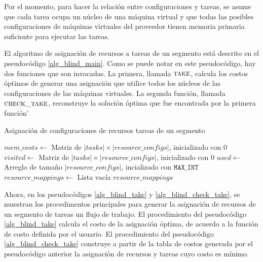 Por el momento, para hacer la relaci\'on entre configuraciones y tareas, se asume que cada tarea ocupa un núcleo de una máquina virtual y que todas las posibles configuraciones de máquinas virtuales del proveedor tienen memoria primaria suficiente para ejecutar las tareas.

El algoritmo de asignación de recursos a tareas de un segmento está descrito en el pseudocódigo \ref{alg_blind_main}. Como se puede notar en este pseudocódigo, hay dos funciones que son invocadas. La primera, llamada $\Call{take}{}$, calcula los costos óptimos de generar una asignación que utilice todos los n\'ucleos de las configuraciones de las máquinas virtuales. La segunda funci\'on, llamada $\Call{check\_take}{}$, reconstruye la soluci\'on \'optima que fue encontrada por la primera funci\'on'

\begin{algorithm}
\caption{Asignación de configuraciones de recursos tareas de un segmento}
\label{alg_blind_main}
\begin{algorithmic}[1]

	\State $mem\_costs \gets$ Matriz de $|tasks| \times |resource\_configs|$, inicializado con 0 
	\State $visited \gets$ Matriz de $|tasks| \times |resource\_configs|$, inicializado con 0
	\State $used \gets$ Arreglo de tamaño $|resource\_configs|$, incializado con $\texttt{MAX\_INT}$
	\State $resource\_mappings \gets$ Lista vacía
	\State {}
	\State {}
	\State \Return $resource\_mappings$
\EndProcedure
\end{algorithmic}
\end{algorithm}


Ahora, en los pseudocódigos \ref{alg_blind_take} y \ref{alg_blind_check_take}, se muestran los procedimentos principales para generar la asignación de recursos de un segmento de tareas un flujo de trabajo. El procedimiento del pseudocódigo \ref{alg_blind_take} calcula el costo de la asignación óptima, de acuerdo a la funci\'on de costo definida por el usuario. El procedimiento del pseudoc\'odigo \ref{alg_blind_check_take} construye a partir de la tabla de costos generada por el pseudoc\'odigo anterior la asignaci\'on de recursos y tareas cuyo costo es m\'inimo.


